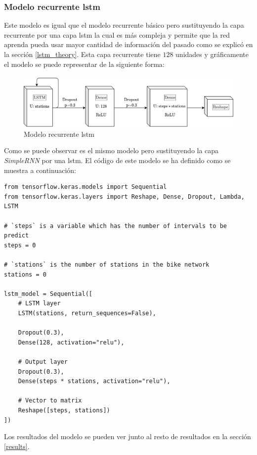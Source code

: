 \subsubsection{Modelo recurrente \acrshort{lstm}}

Este modelo es igual que el modelo recurrente básico pero sustituyendo la capa recurrente por una capa \acrshort{lstm} la cual es más compleja y permite que la red aprenda pueda usar mayor cantidad de información del pasado como se explicó en la sección \ref{lstm_theory}. Esta capa recurrente tiene $128$ unidades y gráficamente el modelo se puede representar de la siguiente forma:
\begin{figure}[H]
    \centering
    \includegraphics[width=12cm]{images/solution/models/LSTM.png}
    \caption{Modelo recurrente \acrshort{lstm}}
    \label{fig:dense-model}
\end{figure}

Como se puede observar es el mismo modelo pero sustituyendo la capa \textit{SimpleRNN} por una \acrshort{lstm}. El código de este modelo se ha definido como se muestra a continuación:
\begin{verbatim}
from tensorflow.keras.models import Sequential
from tensorflow.keras.layers import Reshape, Dense, Dropout, Lambda, LSTM

# `steps` is a variable which has the number of intervals to be predict
steps = 0 

# `stations` is the number of stations in the bike network
stations = 0

lstm_model = Sequential([
    # LSTM layer
    LSTM(stations, return_sequences=False),
    
    Dropout(0.3),
    Dense(128, activation="relu"),
    
    # Output layer
    Dropout(0.3),
    Dense(steps * stations, activation="relu"),
    
    # Vector to matrix
    Reshape([steps, stations])
])
\end{verbatim}

Los resultados del modelo se pueden ver junto al resto de resultados en la sección \ref{results}.